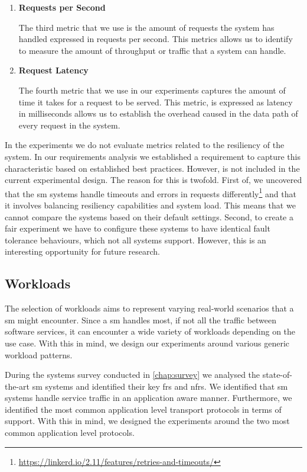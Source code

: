 \begin{enumerate}[label=\textbf{M\arabic*}, leftmargin=3\parindent]
    
    \item \textbf{Requests per Second}
    \label{exp:metric:3}
    
    The third metric that we use is the amount of requests the system has handled expressed in requests per second. This metrics allows us to identify to measure the amount of throughput or traffic that a system can handle. 

    \item \textbf{Request Latency}
    \label{exp:metric:4}
    
    The fourth metric that we use in our experiments captures the amount of time it takes for a request to be served. This metric, is expressed as latency in milliseconds allows us to establish the overhead caused in the data path of every request in the system.

\end{enumerate}

In the experiments we do not evaluate metrics related to the resiliency of the system. In our requirements analysis we established a requirement to capture this characteristic based on established best practices. However, is not included in the current experimental design. The reason for this is twofold. First of, we uncovered that the \gls{sm} systems handle timeouts and errors in requests differently\footnote{\url{https://linkerd.io/2.11/features/retries-and-timeouts/}} and that it involves balancing resiliency capabilities and system load. This means that we cannot compare the systems based on their default settings. Second, to create a fair experiment we have to configure these systems to have identical fault tolerance behaviours, which not all systems support. However, this is an interesting opportunity for future research.


\subsection{Workloads}
\label{sec:experiments:design:workloads}

The selection of workloads aims to represent varying real-world scenarios that a \gls{sm} might encounter. Since a \gls{sm} handles most, if not all the traffic between software services, it can encounter a wide variety of workloads depending on the use case. With this in mind, we design our experiments around various generic workload patterns.

During the systems survey conducted in \cref{chap:survey} we analysed the state-of-the-art \gls{sm} systems and identified their key \glspl{fr} and \glspl{nfr}. We identified that \gls{sm} systems handle service traffic in an application aware manner. Furthermore, we identified the most common application level transport protocols in terms of support. With this in mind, we designed the experiments around the two most common application level protocols. 

